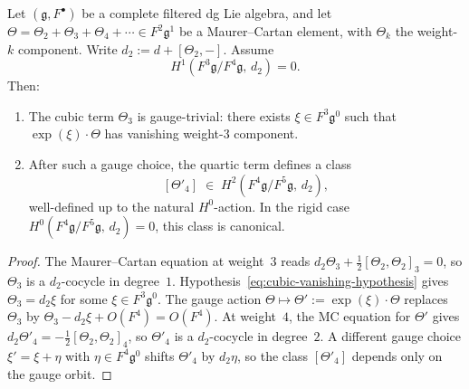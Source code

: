 \begin{theorem}
\label{thm:cubic-gauge-triviality}
\ClaimStatusProvedHere
{}
Let $(\mathfrak{g}, F^\bullet)$ be a complete filtered dg Lie
algebra, and let
$\Theta = \Theta_2 + \Theta_3 + \Theta_4 + \cdots
\in F^2 \mathfrak{g}^1$
be a Maurer--Cartan element, with $\Theta_k$ the weight-$k$
component.  Write $d_2 := d + [\Theta_2, -]$.  Assume
\begin{equation}\label{eq:cubic-vanishing-hypothesis}
H^1(F^3\mathfrak{g}/F^4\mathfrak{g},\, d_2) = 0.
\end{equation}
Then:
\begin{enumerate}[label=\textup{(\roman*)}]
\item The cubic term $\Theta_3$ is gauge-trivial: there
  exists $\xi \in F^3\mathfrak{g}^0$ such that
  $\exp(\xi) \cdot \Theta$ has vanishing weight-$3$
  component.
\item After such a gauge choice, the quartic term defines
  a class
  \begin{equation}\label{eq:quartic-canonical-class}
  [\Theta'_4]
  \;\in\;
  H^2(F^4\mathfrak{g}/F^5\mathfrak{g},\, d_2),
  \end{equation}
  well-defined up to the natural $H^0$-action.  In the
  rigid case
  $H^0(F^4\mathfrak{g}/F^5\mathfrak{g},\, d_2) = 0$,
  this class is canonical.
\end{enumerate}
\end{theorem}

\begin{proof}
The Maurer--Cartan equation at weight~$3$ reads
$d_2 \Theta_3 + \frac12 [\Theta_2, \Theta_2]_3 = 0$,
so $\Theta_3$ is a $d_2$-cocycle in degree~$1$.
Hypothesis~\eqref{eq:cubic-vanishing-hypothesis} gives
$\Theta_3 = d_2 \xi$ for some $\xi \in F^3\mathfrak{g}^0$.
The gauge action
$\Theta \mapsto \Theta' := \exp(\xi) \cdot \Theta$
replaces $\Theta_3$ by
$\Theta_3 - d_2\xi + O(F^4) = O(F^4)$.
At weight~$4$, the MC equation for $\Theta'$ gives
$d_2 \Theta'_4 = -\frac12[\Theta_2, \Theta_2]_4$,
so $\Theta'_4$ is a $d_2$-cocycle in degree~$2$.
A different gauge choice $\xi' = \xi + \eta$
with $\eta \in F^4\mathfrak{g}^0$ shifts $\Theta'_4$
by $d_2\eta$, so the class $[\Theta'_4]$ depends only
on the gauge orbit.
\end{proof}

